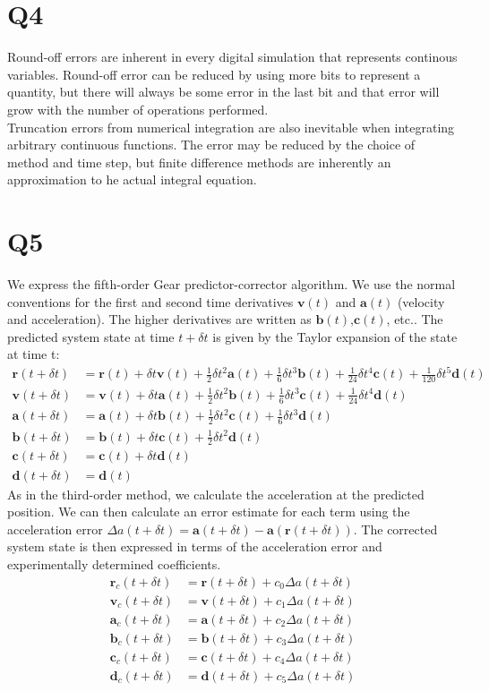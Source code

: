\documentclass[a4paper,11pt]{article}
\numberwithin{equation}{section}
\newcommand{\bv}[1]{\mathbf{#1}}
\begin{document}
\section{Q4}
Round-off errors are inherent in every digital simulation that represents continous variables. 
Round-off error can be reduced by using more bits to represent a quantity, but there will always be some error in the last bit and that error will grow with the number of operations performed.
\\
Truncation errors from numerical integration are also inevitable when integrating arbitrary continuous functions.
The error may be reduced by the choice of method and time step, but finite difference methods are inherently an approximation to he actual integral equation.
\section{Q5}
We express the fifth-order Gear predictor-corrector algorithm. 
We use the normal conventions for the first and second time derivatives $\bv{v}(t)$ and $\bv{a}(t)$ (velocity and acceleration).
The higher derivatives are written as $\bv{b}(t)$,$\bv{c}(t)$, etc..
The predicted system state at time $t+\delta t$ is given by the Taylor expansion of the state at time t:
\begin{align}
 \bv{r}(t+\delta t) &= \bv{r}(t)+\delta t \bv{v}(t) + \frac{1}{2}\delta t^2\bv{a}(t)+\frac{1}{6}\delta t^3\bv{b}(t)+\frac{1}{24}\delta t^4\bv{c}(t)+\frac{1}{120}\delta t^5\bv{d}(t)\\
 \bv{v}(t+\delta t) &= \bv{v}(t)+\delta t \bv{a}(t) + \frac{1}{2}\delta t^2\bv{b}(t)+\frac{1}{6}\delta t^3\bv{c}(t)+\frac{1}{24}\delta t^4\bv{d}(t)\\
 \bv{a}(t+\delta t) &= \bv{a}(t)+\delta t \bv{b}(t) + \frac{1}{2}\delta t^2\bv{c}(t)+\frac{1}{6}\delta t^3\bv{d}(t)\\
 \bv{b}(t+\delta t) &= \bv{b}(t)+\delta t \bv{c}(t) + \frac{1}{2}\delta t^2\bv{d}(t)\\
 \bv{c}(t+\delta t) &= \bv{c}(t)+\delta t \bv{d}(t)\\
 \bv{d}(t+\delta t) &= \bv{d}(t)
\end{align}
As in the third-order method, we calculate the acceleration at the predicted position. 
We can then calculate an error estimate for each term using the acceleration error $\Delta a(t+\delta t)=\bv{a}(t+\delta t)-\bv{a}(\bv{r}(t+\delta t))$.
The corrected system state is then expressed in terms of the acceleration error and experimentally determined coefficients.
\begin{align}
 \bv{r}_c(t+\delta t) &= \bv{r}(t+\delta t)+c_0 \Delta a(t+\delta t)\\
 \bv{v}_c(t+\delta t) &= \bv{v}(t+\delta t)+c_1 \Delta a(t+\delta t)\\
 \bv{a}_c(t+\delta t) &= \bv{a}(t+\delta t)+c_2 \Delta a(t+\delta t)\\
 \bv{b}_c(t+\delta t) &= \bv{b}(t+\delta t)+c_3 \Delta a(t+\delta t)\\
 \bv{c}_c(t+\delta t) &= \bv{c}(t+\delta t)+c_4 \Delta a(t+\delta t)\\
 \bv{d}_c(t+\delta t) &= \bv{d}(t+\delta t)+c_5 \Delta a(t+\delta t)
\end{align}
\end{document}

